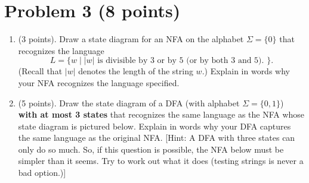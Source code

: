 \documentclass[letterpaper,11pt,twoside]{article}
\theoremstyle{plain}
\theoremstyle{definition}
\theoremstyle{remark}
\theoremstyle{restate}
\begin{document}
\clearpage
\section{Problem 3 (8 points)}

\begin{enumerate}
    \item (3 points). Draw a state diagram for an NFA on the alphabet $\Sigma = \{0\}$ that recognizes the language
    \[
        L = \{w \; | \; |w| \text{ is divisible by 3 or by 5 (or by both 3 and 5). } \}.
    \]
    (Recall that $|w|$ denotes the length of the string $w$.) Explain in words why your NFA recognizes the language specified.
    
    
    \item (5 points). Draw the state diagram of a DFA (with alphabet $\Sigma = \{0,1\}$) \textbf{with at most 3 states} that recognizes the same language as the NFA whose state diagram is pictured below. Explain in words why your DFA captures the same language as the original NFA. [Hint: A DFA with three states can only do so much. So, if this question is possible, the NFA below must be simpler than it seems. Try to work out what it does (testing strings is never a bad option.)]
    

\end{enumerate}
\end{document}
